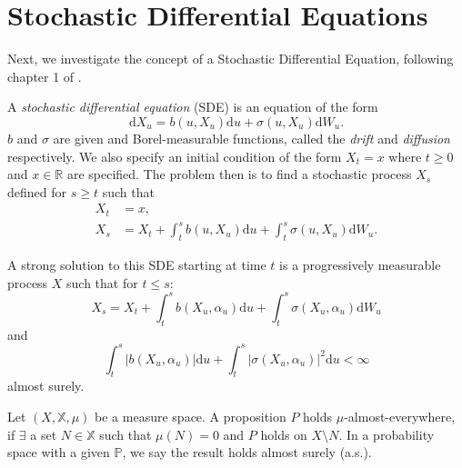 \section{Stochastic Differential Equations}\label{sec:1.6}

Next, we investigate the concept of a Stochastic Differential Equation, following chapter 
1 of \textcite{Pham}.

\begin{definition}
    A \emph{stochastic differential equation} (SDE) is an equation of the form
    \begin{equation}\label{eq:1.28}
        \mathrm dX_u=b(u,X_u)\mathrm du+\sigma(u,X_u)\mathrm dW_u.
    \end{equation}
    $b$ and $\sigma$ are given and Borel-measurable functions, called the
    \emph{drift} and \emph{diffusion} respectively. We also specify an initial condition
    of the form $X_t=x$ where $t\geq0$ and $x\in\mathbb{R}$ are specified. The problem
    then is to find a stochastic process $X_s$ defined for $s\geq t$ such that
    \begin{align*}
        X_t&=x,\\
        X_s&=X_t+\int_t^sb(u,X_u)\mathrm du+\int_t^s\sigma(u,X_u)\mathrm dW_u.
    \end{align*}
\end{definition}

\begin{definition}
    A strong solution to this SDE starting at time $t$ is a progressively measurable 
    process $X$ such that for $t\leq s$:
    $$X_s=X_t+\int_{t}^{s}b(X_u,\alpha_u)\mathrm du+\int_t^s\sigma(X_u,\alpha_u)\mathrm dW_u$$
    and
    $$\int_t^s|b(X_u,\alpha_u)|\mathrm du+\int_t^s|\sigma(X_u,\alpha_u)|^2\mathrm du<\infty$$
    almost surely.
\end{definition}

\begin{remark}
    Let $(X,\mathbb{X},\mu)$ be a measure space. A proposition $P$ holds $\mu$-almost-everywhere,
    if $\exists$ a set $N\in\mathbb{X}$ such that $\mu(N)=0$ and $P$ holds on $X\setminus N$.
    In a probability space with a given $\mathbb{P}$, we say the result holds almost surely (a.s.).
\end{remark}

